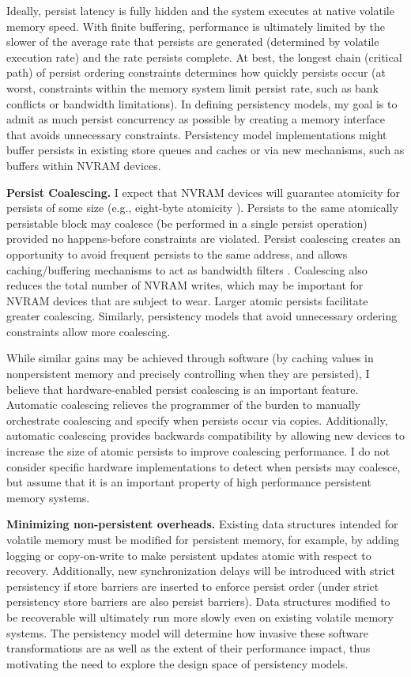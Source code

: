 Ideally, persist latency is fully hidden and the system executes at native volatile memory speed.
With finite buffering, performance is ultimately limited by the slower of the average rate that persists are generated (determined by volatile execution rate) and the rate persists complete.
At best, the longest chain (critical path) of persist ordering constraints determines how quickly persists occur (at worst, constraints within the memory system limit persist rate, such as bank conflicts or bandwidth limitations).
In defining persistency models, my goal is to admit as much persist concurrency as possible by creating a memory interface that avoids unnecessary constraints.
Persistency model implementations might buffer persists in existing store queues and caches or via new mechanisms, such as buffers within NVRAM devices.

\textbf{Persist Coalescing.}
I expect that NVRAM devices will guarantee atomicity for persists of some size (e.g., eight-byte atomicity \cite{ConditNightingale09}).
Persists to the same atomically persistable block may coalesce (be performed in a single persist operation) provided no happens-before constraints are violated. 
Persist coalescing creates an opportunity to avoid frequent persists to the same address, and allows caching/buffering mechanisms to act as bandwidth filters \cite{Goodman83}.
Coalescing also reduces the total number of NVRAM writes, which may be important for NVRAM devices that are subject to wear.
Larger atomic persists facilitate greater coalescing.
Similarly, persistency models that avoid unnecessary ordering constraints allow more coalescing. 

While similar gains may be achieved through software (by caching values in nonpersistent memory and precisely controlling when they are persisted), I believe that hardware-enabled persist coalescing is an important feature.
Automatic coalescing relieves the programmer of the burden to manually orchestrate coalescing and specify when persists occur via copies.
Additionally, automatic coalescing provides backwards compatibility by allowing new devices to increase the size of atomic persists to improve coalescing performance.
I do not consider specific hardware implementations to detect when persists may coalesce, but assume that it is an important property of high performance persistent memory systems.

\textbf{Minimizing non-persistent overheads.}
Existing data structures intended for volatile memory must be modified for persistent memory, for example, by adding logging or copy-on-write to make persistent updates atomic with respect to recovery.
Additionally, new synchronization delays will be introduced with strict persistency if store barriers are inserted to enforce persist order (under strict persistency store barriers are also persist barriers).
Data structures modified to be recoverable will ultimately run more slowly even on existing volatile memory systems.
The persistency model will determine how invasive these software transformations are as well as the extent of their performance impact, thus motivating the need to explore the design space of persistency models.

